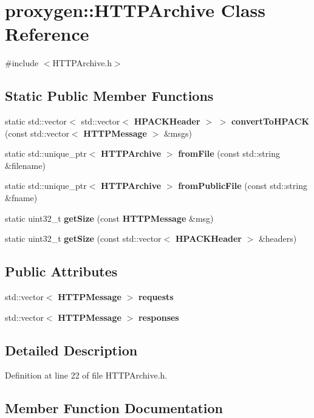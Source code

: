 \section{proxygen\+:\+:H\+T\+T\+P\+Archive Class Reference}
\label{classproxygen_1_1HTTPArchive}


{\ttfamily \#include $<$H\+T\+T\+P\+Archive.\+h$>$}

\subsection*{Static Public Member Functions}
\begin{DoxyCompactItemize}
\item 
static std\+::vector$<$ std\+::vector$<$ {\bf H\+P\+A\+C\+K\+Header} $>$ $>$ {\bf convert\+To\+H\+P\+A\+CK} (const std\+::vector$<$ {\bf H\+T\+T\+P\+Message} $>$ \&msgs)
\item 
static std\+::unique\+\_\+ptr$<$ {\bf H\+T\+T\+P\+Archive} $>$ {\bf from\+File} (const std\+::string \&filename)
\item 
static std\+::unique\+\_\+ptr$<$ {\bf H\+T\+T\+P\+Archive} $>$ {\bf from\+Public\+File} (const std\+::string \&fname)
\item 
static uint32\+\_\+t {\bf get\+Size} (const {\bf H\+T\+T\+P\+Message} \&msg)
\item 
static uint32\+\_\+t {\bf get\+Size} (const std\+::vector$<$ {\bf H\+P\+A\+C\+K\+Header} $>$ \&headers)
\end{DoxyCompactItemize}
\subsection*{Public Attributes}
\begin{DoxyCompactItemize}
\item 
std\+::vector$<$ {\bf H\+T\+T\+P\+Message} $>$ {\bf requests}
\item 
std\+::vector$<$ {\bf H\+T\+T\+P\+Message} $>$ {\bf responses}
\end{DoxyCompactItemize}


\subsection{Detailed Description}


Definition at line 22 of file H\+T\+T\+P\+Archive.\+h.



\subsection{Member Function Documentation}
